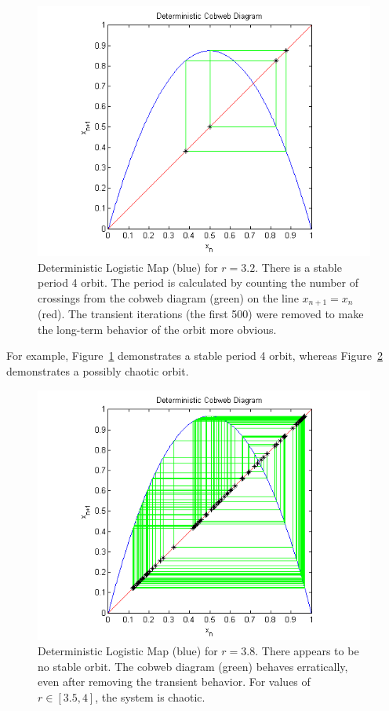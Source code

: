 \begin{figure}[!h]
\caption[Deterministic logistic map, stable orbit]{Deterministic Logistic Map (blue) for $r=3.2$. There is a stable period
4 orbit. The period is calculated by counting the number
of crossings from the cobweb diagram (green) on the line $x_{n+1}=x_n$
(red). The transient iterations (the first 500) were removed to make
the long-term behavior of the orbit more obvious.}\label{fig:detlogstable}
    \begin{center}
	\includegraphics[scale=0.8]{figs/det_cobweb.png}
    \end{center}
\end{figure}
For example, Figure~\ref{fig:detlogstable}
demonstrates a stable period 4 orbit, whereas Figure~\ref{fig:detlogunstable}
demonstrates a possibly chaotic orbit. 
\begin{figure}[!h]
\caption[Deterministic logistic map, unstable orbit]{Deterministic
  Logistic Map (blue) for $r=3.8$. There appears to be no
  stable orbit. The cobweb diagram (green) behaves erratically, even
  after removing the transient behavior. For values of $r \in
  [3.5,4]$, the system is chaotic.}\label{fig:detlogunstable}
	\begin{center}
		\includegraphics[scale=0.8]{figs/chaos.png}
	\end{center}
\end{figure} 
